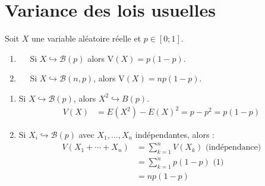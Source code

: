 \documentclass[../main.tex]{subfiles}
\begin{document}
\section{Variance des lois usuelles}
\begin{tcolorbox}[title=Théorème 33.16, title filled=false, colframe=orange, colback=orange!10!white]
    Soit $X$ une variable aléatoire réelle et $p \in[0 ; 1]$.
    \begin{enumerate}
        \item $\quad$ Si $X \hookrightarrow \mathcal{B}(p)$ alors $\mathrm{V}(X)=p(1-p)$.
        \item $\quad$ Si $X \hookrightarrow \mathcal{B}(n, p)$, alors $\mathrm{V}(X)=n p(1-p)$.
    \end{enumerate}
\end{tcolorbox}

\begin{enumerate}
    \item Si $X \hookrightarrow \mathcal{B}(p)$, alors $X^2\hookrightarrow B(p)$. 
    \begin{align*}
        V(X) &= E(X^2) - E(X)^2 = p - p^2 = p(1-p)
    \end{align*}
    \item Si $X_i\hookrightarrow \mathcal{B}(p)$ avec $X_1, \ldots, X_n$ indépendantes, alors : 
    \begin{align*}
        V(X_1 + \cdots + X_n) &= \sum_{k=1}^{n} V(X_k) \text{ (indépendance)} \\
        &= \sum_{k=1}^{n} p(1-p) \text{ (1)} \\
        &= np(1-p)
    \end{align*}
\end{enumerate}
\end{document}
